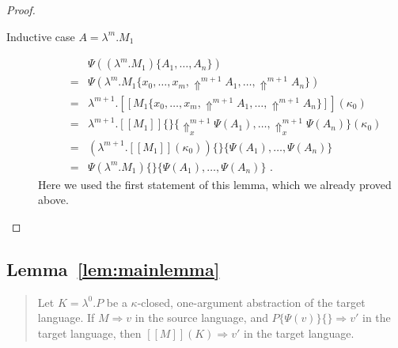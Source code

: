 \documentclass[a4paper,11pt,draft]{article}
\begin{document}
\begin{proof}
\begin{description}
\item[\sffamily Inductive case $A = \lambda^{m}.M_{1}$]\hfill
  \begin{eqnarray*}
    &   & \Psi((\lambda^{m}.M_{1})\{A_{1}, \ldots, A_{n}\}) \\
    & = & \Psi(\lambda^{m}.M_{1}\{x_{0}, \ldots, x_{m}, \Uparrow^{m+1} A_{1}, \ldots, \Uparrow^{m+1} A_{n}\}) \\
    & = & \lambda^{m+1}.[\![M_{1}\{x_{0}, \ldots, x_{m}, \Uparrow^{m+1} A_{1}, \ldots, \Uparrow^{m+1} A_{n}\}]\!](\kappa_{0}) \\
    & = & \lambda^{m+1}.[\![M_{1}]\!]\{\}\{\Uparrow_{x}^{m+1} \Psi(A_{1}), \ldots, \Uparrow_{x}^{m+1} \Psi(A_{n})\}(\kappa_{0}) \\
    & = & (\lambda^{m+1}.[\![M_{1}]\!](\kappa_{0}))\{\}\{\Psi(A_{1}), \ldots, \Psi(A_{n})\} \\
    & = & \Psi(\lambda^{m}.M_{1})\{\}\{\Psi(A_{1}), \ldots, \Psi(A_{n})\} \text{ .}
  \end{eqnarray*}
  Here we used the first statement of this lemma, which we already proved above.\qedhere
\end{description}
\end{proof}


\subsection{Lemma~\ref{lem:mainlemma}}

\begin{quote}
  Let $K = \lambda^{0}.P$ be a $\kappa$-closed, one-argument
  abstraction of the target language. If $M \Rightarrow v$ in the
  source language, and $P\{\Psi(v)\}\{\} \Rightarrow v'$ in the target
  language, then $[\![M]\!](K) \Rightarrow v'$ in the target language.
\end{quote}
\end{document}
